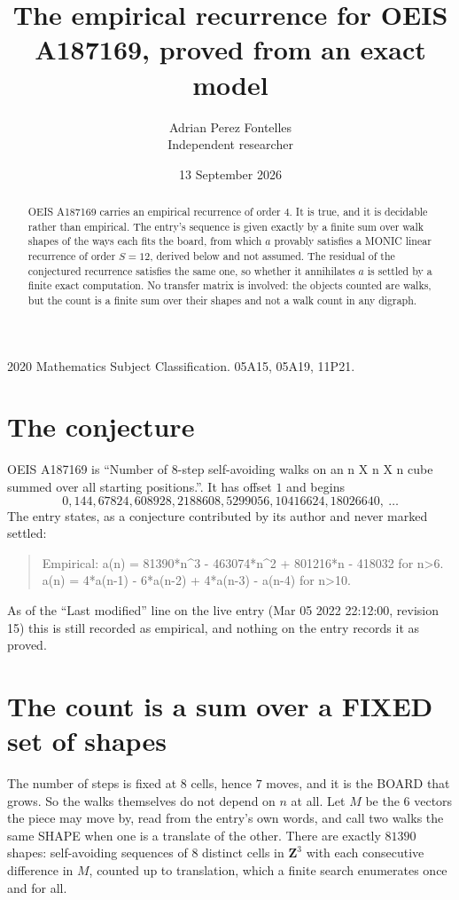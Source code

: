 \documentclass[11pt,a4paper]{article}
\title{The empirical recurrence for OEIS A187169, proved from an exact model}
\author{Adrian Perez Fontelles\\ \small Independent researcher}
\date{13 September 2026}
\theoremstyle{plain}
\theoremstyle{definition}
\begin{document}
\maketitle

\begin{abstract}
OEIS A187169 carries an empirical recurrence of order $4$. It is true, and it is
decidable rather than empirical. The entry's sequence is given exactly by a finite sum over walk shapes of the ways each fits the board, from
which $a$ provably satisfies a MONIC linear recurrence of order $S=12$, derived below and not
assumed. The residual of the conjectured recurrence satisfies the same one, so whether it
annihilates $a$ is settled by a finite exact computation. No transfer matrix is involved: the objects counted are walks, but the count is a finite sum over their shapes and not a walk count in any digraph.
\end{abstract}

\noindent\small 2020 Mathematics Subject Classification. 05A15, 05A19, 11P21.\normalsize

\section{The conjecture}

OEIS A187169 is ``Number of 8-step self-avoiding walks on an n X n X n cube summed over all starting positions.''. It has offset $1$ and begins
\[
0, 144, 67824, 608928, 2188608, 5299056, 10416624, 18026640,\ \dots
\]
The entry states, as a conjecture contributed by its author and never marked settled:
\begin{quote}
Empirical: a(n) = 81390*n\^{}3 - 463074*n\^{}2 + 801216*n - 418032 for n>6. a(n) = 4*a(n-1) - 6*a(n-2) + 4*a(n-3) - a(n-4) for n>10.
\end{quote}
As of the ``Last modified'' line on the live entry (Mar 05 2022 22:12:00, revision 15)
this is still recorded as empirical, and nothing on the entry records it as proved.

\section{The count is a sum over a FIXED set of shapes}

The number of steps is fixed at $8$ cells, hence $7$ moves, and it is the BOARD
that grows. So the walks themselves do not depend on $n$ at all. Let $M$ be the $6$
vectors the piece may move by, read from the entry's own words, and call two walks the same
SHAPE when one is a translate of the other. There are exactly $81390$ shapes: self-avoiding
sequences of $8$ distinct cells in $\mathbf{Z}^{3}$ with each consecutive difference in
$M$, counted up to translation, which a finite search enumerates once and for all.
\end{document}
